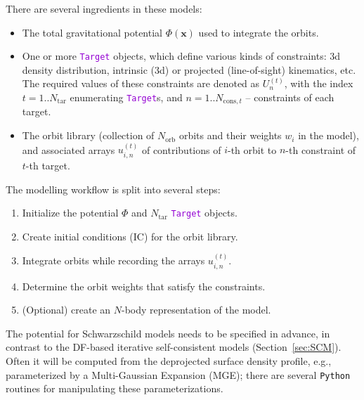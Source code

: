 \documentclass[12pt]{article}
\newcommand{\Python}{\texttt{Python}\xspace}
\newcommand{\ttt}[1]{\textcolor{darkviolet}{\texttt{#1}}}
\newcommand{\bx}{\boldsymbol{x}}
\begin{document}
There are several ingredients in these models:
\begin{itemize}  \setlength{\parskip}{2pt} \setlength{\itemsep}{2pt}
\item The total gravitational potential $\Phi(\bx)$ used to integrate the orbits.
\item One or more \ttt{Target} objects, which define various kinds of constraints: 3d density distribution, intrinsic (3d) or projected (line-of-sight) kinematics, etc. The required values of these constraints are denoted as $U_n^{(t)}$, with the index $t=1..N_\mathrm{tar}$ enumerating \ttt{Target}s, and $n=1..N_{\mathrm{cons},t}$ -- constraints of each target.
\item The orbit library (collection of $N_\mathrm{orb}$ orbits and their weights $w_i$ in the model), and associated arrays $u_{i,n}^{(t)}$ of contributions of $i$-th orbit to $n$-th constraint of $t$-th target.
\end{itemize}

The modelling workflow is split into several steps:
\begin{enumerate}  \setlength{\parskip}{2pt} \setlength{\itemsep}{2pt}
\item Initialize the potential $\Phi$ and $N_\mathrm{tar}$ \ttt{Target} objects.
\item Create initial conditions (IC) for the orbit library.
\item Integrate orbits while recording the arrays $u_{i,n}^{(t)}$.
\item Determine the orbit weights that satisfy the constraints.
\item (Optional) create an $N$-body representation of the model.
\end{enumerate}

The potential for Schwarzschild models needs to be specified in advance, in contrast to the DF-based iterative self-consistent models (Section~\ref{sec:SCM}). Often it will be computed from the deprojected surface density profile, e.g., parameterized by a Multi-Gaussian Expansion (MGE); there are several \Python routines for manipulating these parameterizations.
\end{document}
